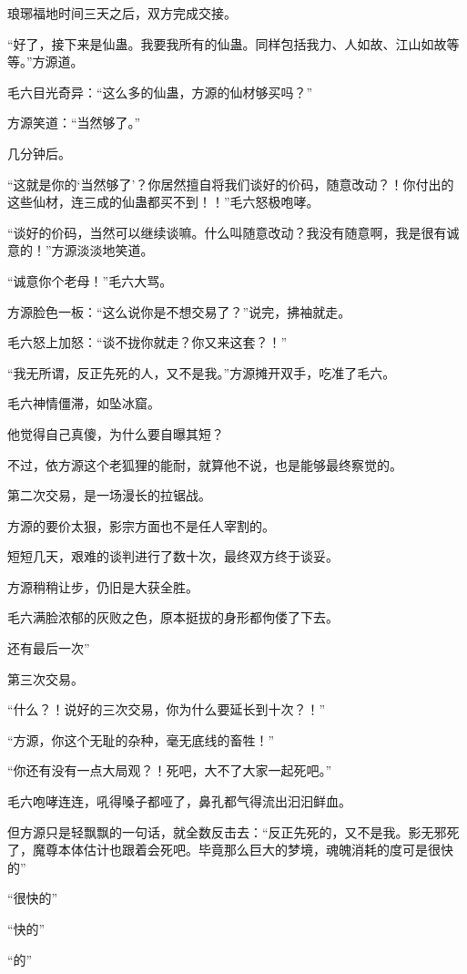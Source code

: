 \begin{this_body}
琅琊福地时间三天之后，双方完成交接。

“好了，接下来是仙蛊。我要我所有的仙蛊。同样包括我力、人如故、江山如故等等。”方源道。

毛六目光奇异：“这么多的仙蛊，方源的仙材够买吗？”

方源笑道：“当然够了。”

几分钟后。

“这就是你的‘当然够了’？你居然擅自将我们谈好的价码，随意改动？！你付出的这些仙材，连三成的仙蛊都买不到！！”毛六怒极咆哮。

“谈好的价码，当然可以继续谈嘛。什么叫随意改动？我没有随意啊，我是很有诚意的！”方源淡淡地笑道。

“诚意你个老母！”毛六大骂。

方源脸色一板：“这么说你是不想交易了？”说完，拂袖就走。

毛六怒上加怒：“谈不拢你就走？你又来这套？！”

“我无所谓，反正先死的人，又不是我。”方源摊开双手，吃准了毛六。

毛六神情僵滞，如坠冰窟。

他觉得自己真傻，为什么要自曝其短？

不过，依方源这个老狐狸的能耐，就算他不说，也是能够最终察觉的。

第二次交易，是一场漫长的拉锯战。

方源的要价太狠，影宗方面也不是任人宰割的。

短短几天，艰难的谈判进行了数十次，最终双方终于谈妥。

方源稍稍让步，仍旧是大获全胜。

毛六满脸浓郁的灰败之色，原本挺拔的身形都佝偻了下去。

还有最后一次”

第三次交易。

“什么？！说好的三次交易，你为什么要延长到十次？！”

“方源，你这个无耻的杂种，毫无底线的畜牲！”

“你还有没有一点大局观？！死吧，大不了大家一起死吧。”

毛六咆哮连连，吼得嗓子都哑了，鼻孔都气得流出汩汩鲜血。

但方源只是轻飘飘的一句话，就全数反击去：“反正先死的，又不是我。影无邪死了，魔尊本体估计也跟着会死吧。毕竟那么巨大的梦境，魂魄消耗的度可是很快的”

“很快的”

“快的”

“的”


\end{this_body}
